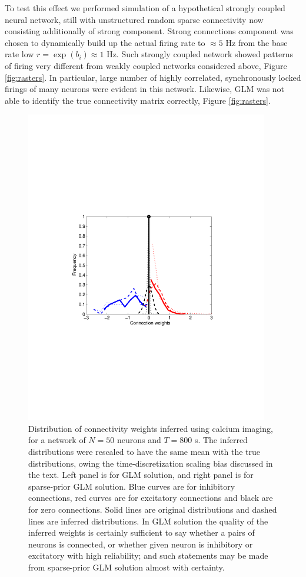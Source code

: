 To test this effect we performed simulation of a hypothetical strongly coupled  neural network, still with unstructured random sparse connectivity now consisting additionally of strong component. Strong connections component was chosen to dynamically build up the actual firing rate to $\approx 5$ Hz from the base rate low $r=\exp(b_i)\approx 1$ Hz. Such strongly coupled network showed patterns of firing very different from weakly coupled networks considered above, Figure \ref{fig:rasters}.  In particular, large number of highly correlated, synchronously locked firings of many neurons were evident in this network.  Likewise, GLM was not able to identify the true connectivity matrix correctly, Figure \ref{fig:rasters}. 

\begin{figure}
\includegraphics[width=300pt]{../figs/Figure5_hist_glm_vanilla}
\caption{Distribution of connectivity weights inferred using calcium imaging, for
a network of $N=50$ neurons and $T=800$ s. The inferred distributions were rescaled
to have the same mean with the true distributions, owing the time-discretization scaling bias
discussed in the text.
Left panel is for GLM solution,
and right panel is for sparse-prior GLM solution.
Blue curves are for inhibitory connections, red curves are for excitatory
connections and black are for zero connections. Solid lines are original
distributions and dashed lines are inferred distributions. In GLM solution the quality of the inferred weights is certainly sufficient to say whether a pairs of neurons is connected, or whether given neuron is inhibitory or excitatory with high reliability; and such statements may be made from sparse-prior GLM solution almost with certainty.}
\label{fig:distr}
\end{figure}


